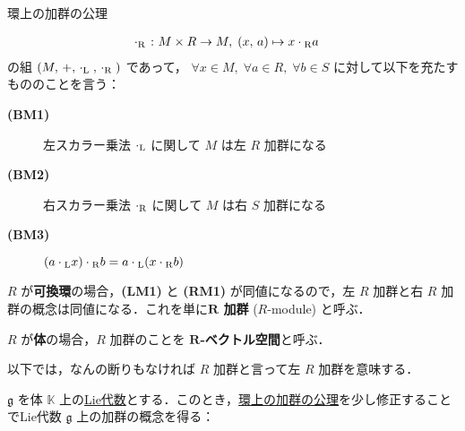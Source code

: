 \documentclass[rep_main]{subfiles}
\begin{document}
\begin{myaxiom}[label=ax:R-module,breakable]{環上の加群の公理}
\begin{itemize}
\begin{align}
			\cdot{}_{\mathrm{R}} \mathrel{} &\colon M \times R \to M,\; (x,\, a) \mapsto x \cdot{}_{\mathrm{R}} a
		\end{align}
		の組  $(M,\, +,\, \cdot{}_{\mathrm{L}}\mathrel{},\, \cdot{}_{\mathrm{R}}\mathrel{})$ であって， 
		$\forall x\in M,\; \forall a\in R,\; \forall b \in S$ に対して以下を充たすもののことを言う：
		\begin{description}
			\item[\textbf{(BM1)}] 左スカラー乗法 $\cdot{}_{\mathrm{L}}$ に関して $M$ は左 $R$ 加群になる
			\item[\textbf{(BM2)}] 右スカラー乗法 $\cdot{}_{\mathrm{R}}$ に関して $M$ は右 $S$ 加群になる
			\item[\textbf{(BM3)}] $(a \cdot{}_{\mathrm{L}} x) \cdot{}_{\mathrm{R}} b = a \cdot{}_{\mathrm{L}} (x \cdot{}_{\mathrm{R}} b)$
		\end{description}
	\end{itemize}
\end{myaxiom}

$R$ が\textbf{可換環}の場合，\textsf{\textbf{(LM1)}} と \textsf{\textbf{(RM1)}} が同値になるので，左 $R$ 加群と右 $R$ 加群の概念は同値になる．これを単に\textbf{$\bm{R}$ 加群} ($R$-module) と呼ぶ．

$R$ が\textbf{体}の場合，$R$ 加群のことを \textbf{$\bm{R}$-ベクトル空間}と呼ぶ．

\begin{marker}
	以下では，なんの断りもなければ $R$ 加群と言って左 $R$ 加群を意味する．
\end{marker}

$\mathfrak{g}$ を体 $\mathbb{K}$ 上の\hyperref[ax:LieAlg]{Lie代数}とする．このとき，\hyperref[ax:R-module]{環上の加群の公理}を少し修正することでLie代数 $\mathfrak{g}$ 上の加群の概念を得る：
\end{document}
